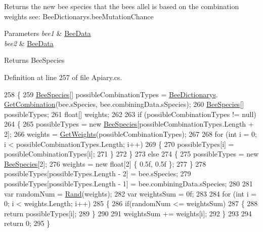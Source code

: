 Returns the new bee species that the bees allel is based on the combination weights see\+: Bee\+Dictionarys.\+bee\+Mutation\+Chance 


\begin{DoxyParams}{Parameters}
{\em bee1} & \hyperlink{struct_bee_game_1_1_bee_1_1_bee_data}{Bee\+Data}\\
\hline
{\em bee2} & \hyperlink{struct_bee_game_1_1_bee_1_1_bee_data}{Bee\+Data}\\
\hline
\end{DoxyParams}
\begin{DoxyReturn}{Returns}
Bee\+Species
\end{DoxyReturn}


Definition at line 257 of file Apiary.\+cs.


\begin{DoxyCode}
258         \{
259             \hyperlink{namespace_bee_game_1_1_enums_aa2ead984825678d83c42d48f6382619c}{BeeSpecies}[] possibleCombinationTypes = \hyperlink{class_bee_game_1_1_core_1_1_bee_dictionarys}{BeeDictionarys}.
      \hyperlink{class_bee_game_1_1_core_1_1_bee_dictionarys_ac2d555d589392daf8d2919b6bf1fbad1}{GetCombination}(bee.sSpecies, bee.combiningData.sSpecies);
260             \hyperlink{namespace_bee_game_1_1_enums_aa2ead984825678d83c42d48f6382619c}{BeeSpecies}[] possibleTypes;
261             \textcolor{keywordtype}{float}[] weights;
262 
263             \textcolor{keywordflow}{if} (possibleCombinationTypes != null)
264             \{
265                 possibleTypes = \textcolor{keyword}{new} \hyperlink{namespace_bee_game_1_1_enums_aa2ead984825678d83c42d48f6382619c}{BeeSpecies}[possibleCombinationTypes.Length + 2];
266                 weights = \hyperlink{class_bee_game_1_1_bee_1_1_apiary_a0baa1876277fd0e541f0f6b2d347e69b}{GetWeights}(possibleCombinationTypes);
267                 
268                 \textcolor{keywordflow}{for} (\textcolor{keywordtype}{int} i = 0; i < possibleCombinationTypes.Length; i++)
269                 \{
270                     possibleTypes[i] = possibleCombinationTypes[i];
271                 \}
272             \}
273             \textcolor{keywordflow}{else}
274             \{
275                 possibleTypes = \textcolor{keyword}{new} \hyperlink{namespace_bee_game_1_1_enums_aa2ead984825678d83c42d48f6382619c}{BeeSpecies}[2];
276                 weights = \textcolor{keyword}{new} \textcolor{keywordtype}{float}[2] \{ 0.5f, 0.5f \};
277             \}
278             possibleTypes[possibleTypes.Length - 2] = bee.sSpecies;
279             possibleTypes[possibleTypes.Length - 1] = bee.combiningData.sSpecies;
280 
281             var randomNum = \hyperlink{class_bee_game_1_1_bee_1_1_apiary_a1523391d65f498bd64df18f62840c2f0}{Rand}(weights);
282             var weightsSum = 0f;
283 
284             \textcolor{keywordflow}{for} (\textcolor{keywordtype}{int} i = 0; i < weights.Length; i++)
285             \{
286                 \textcolor{keywordflow}{if}(randomNum <= weightsSum)
287                 \{
288                     \textcolor{keywordflow}{return} possibleTypes[i];
289                 \}
290 
291                 weightsSum += weights[i];
292             \}
293 
294             \textcolor{keywordflow}{return} 0;
295         \}
\end{DoxyCode}
